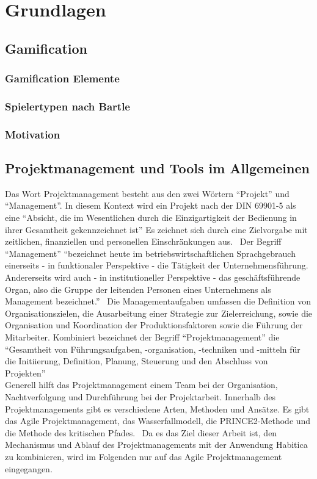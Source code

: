 \documentclass[sigconf, nonacm]{acmart}
\begin{document}
\section{Grundlagen}
\subsection{Gamification}

\subsubsection{Gamification Elemente}

\subsubsection{Spielertypen nach Bartle}

\subsubsection{Motivation}

\subsection{Projektmanagement und Tools im Allgemeinen}
Das Wort Projektmanagement besteht aus den zwei Wörtern \enquote{Projekt} und \enquote{Management}. 
In diesem Kontext wird ein Projekt nach der DIN 69901-5 als eine \enquote{Absicht, die im Wesentlichen durch die Einzigartigkeit der Bedienung in ihrer Gesamtheit gekennzeichnet ist} Es zeichnet sich durch eine Zielvorgabe mit zeitlichen, finanziellen und personellen Einschränkungen aus.~\cite{DIN69901-5} 
Der Begriff \enquote{Management} \enquote{bezeichnet heute im betriebswirtschaftlichen Sprachgebrauch einerseits - in funktionaler Perspektive - die Tätigkeit der Unternehmensführung. Andererseits wird auch - in institutioneller Perspektive - das geschäftsführende Organ, also die Gruppe der leitenden Personen eines Unternehmens als Management bezeichnet.}~\cite{haric_definition_nodate} 
Die Managementaufgaben umfassen die Definition von Organisationszielen, die Ausarbeitung einer Strategie zur Zielerreichung, sowie die Organisation und Koordination der Produktionsfaktoren sowie die Führung der Mitarbeiter.
Kombiniert bezeichnet der Begriff \enquote{Projektmanagement} die \enquote{Gesamtheit von Führungsaufgaben, -organisation, -techniken und -mitteln für die Initiierung, Definition, Planung, Steuerung und den Abschluss von Projekten}~\cite{DIN69901-5}
\\
Generell hilft das Projektmanagement einem Team bei der Organisation, Nachtverfolgung und Durchführung bei der Projektarbeit. Innerhalb des Projektmanagements gibt es verschiedene Arten, Methoden und Ansätze. Es gibt das Agile Projektmanagement, das Wasserfallmodell, die PRINCE2-Methode und die Methode des kritischen Pfades.~\cite{asana_projektmanagement_nodate} Da es das Ziel dieser Arbeit ist, den Mechanismus und Ablauf des Projektmanagements mit der Anwendung Habitica zu kombinieren, wird im Folgenden nur auf das Agile Projektmanagement eingegangen.
\end{document}
